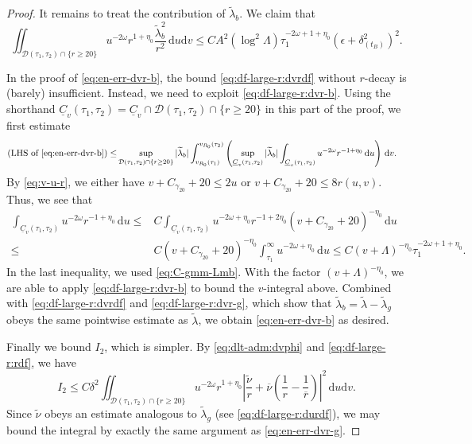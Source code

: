 \documentclass[10pt, reqno]{amsart}
\theoremstyle{definition}
\theoremstyle{remark}
\theoremstyle{conjecture}
\numberwithin{equation}{section}
\newcommand{\abs}[1]{\vert#1\vert}
\newcommand{\set}[1]{\{#1\}}
\newcommand{\ud}{\mathrm{d}}
\newcommand{\0}{\emptyset}
\newcommand{\gmm}{\gamma}
\newcommand{\dlt}{\delta}
\newcommand{\eps}{\epsilon}
\newcommand{\lmb}{\lambda}
\newcommand{\Lmb}{\Lambda}
\newcommand{\omg}{\omega}
\newcommand{\calD}{\mathcal D}
\newcommand{\uC}{\underline{C}}
\newcommand{\dur}{\nu}
\newcommand{\dvr}{\lmb}
\newcommand{\dvrbg}{\overline{\dvr}}				%
\newcommand{\durbg}{\overline{\dur}}				%
\newcommand{\rbg}{\overline{r}}					%
\newcommand{\dvrdf}{\widetilde{\dvr}}				%
\newcommand{\durdf}{\widetilde{\dur}}				%
\newcommand{\Abs}[1]{\left\vert #1 \right\vert}
\begin{document}
\begin{proof}
It remains to treat the contribution of $\dvrdf_{b}$. We claim that
\begin{equation} \label{eq:en-err-dvr-b}
	\iint_{\calD(\tau_{1}, \tau_{2}) \cap \set{r \geq 20}} u^{-2\omg} r^{1 + \eta_{0}} \frac{\dvrdf_{b}^{2}}{r^{2}} \, \ud u \ud v
	\leq C A^{2} (\log^{2} \Lmb) \tau_{1}^{-2 \omg + 1 + \eta_{0}} \left( \eps + \dlt_{(t_{B})}^{2} \right)^{2}.
\end{equation}

In the proof of \eqref{eq:en-err-dvr-b}, the bound \eqref{eq:df-large-r:dvrdf} without $r$-decay is (barely) insufficient. Instead, we need to exploit \eqref{eq:df-large-r:dvr-b}.
Using the shorthand $\uC_{v}(\tau_{1}, \tau_{2}) = \uC_{v} \cap \calD(\tau_{1}, \tau_{2}) \cap \set{r \geq 20}$ in this part of the proof, we first estimate
\begin{align*}
	(\hbox{LHS of \eqref{eq:en-err-dvr-b}})
	\leq & \sup_{\calD(\tau_{1}, \tau_{2}) \cap \set{r \geq 20}} \abs{\dvrdf_{b}} 
	\int_{v_{R_{0}}(\tau_{1})}^{v_{R_{0}}(\tau_{2})} \left( \sup_{\uC_{v}(\tau_{1}, \tau_{2})} \abs{\dvrdf_{b}} \int_{\uC_{v}(\tau_{1}, \tau_{2})} u^{-2 \omg} r^{-1+\eta_{0}} \, \ud u \right) \, \ud v.
\end{align*}
By \eqref{eq:v-u-r}, we either have $v + C_{\gmm_{20}} + 20 \leq 2 u$ or $v + C_{\gmm_{20}} + 20 \leq 8 r(u, v)$. Thus, we see that
\begin{align*}
\int_{\uC_{v}(\tau_{1}, \tau_{2})} u^{-2 \omg} r^{-1+\eta_{0}} \, \ud u
\leq & C \int_{\uC_{v}(\tau_{1}, \tau_{2})} u^{-2 \omg + \eta_{0}} r^{-1+2\eta_{0}} (v + C_{\gmm_{20}} + 20)^{-\eta_{0}} \, \ud u \\
\leq & C (v + C_{\gmm_{20}} + 20)^{-\eta_{0}} \int_{\tau_{1}}^{\infty} u^{-2 \omg + \eta_{0}} \, \ud u\leq C (v + \Lmb)^{-\eta_{0}} \tau_{1}^{-2 \omg + 1 + \eta_{0}}.
\end{align*}
In the last inequality, we used \eqref{eq:C-gmm-Lmb}. With the factor $(v + \Lmb)^{-\eta_{0}}$, we are able to apply \eqref{eq:df-large-r:dvr-b} to bound the $v$-integral above. Combined with \eqref{eq:df-large-r:dvrdf} and \eqref{eq:df-large-r:dvr-g}, which show that $\dvrdf_{b} = \dvrdf - \dvrdf_{g}$ obeys the same pointwise estimate as $\dvrdf$, we obtain \eqref{eq:en-err-dvr-b} as desired.

Finally we bound $I_{2}$, which is simpler. By \eqref{eq:dlt-adm:dvphi} and \eqref{eq:df-large-r:rdf}, we have
\begin{equation*}
	I_{2} \leq C \dlt^{2} \iint_{\calD(\tau_{1}, \tau_{2}) \cap \set{r \geq 20}} u^{-2\omg} r^{1+\eta_{0}} \Abs{\frac{\durdf}{r} + \durbg \left(\frac{1}{r} - \frac{1}{\rbg}\right)}^{2} \, \ud u \ud v .
\end{equation*}
Since $\durdf$ obeys an estimate analogous to $\dvrdf_{g}$ (see \eqref{eq:df-large-r:durdf}), we may bound the integral by exactly the same argument as \eqref{eq:en-err-dvr-g}.


\end{proof}
\end{document}
